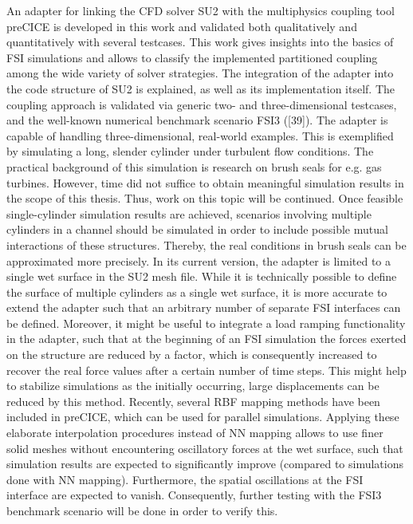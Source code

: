 An adapter for linking the CFD solver SU2 with the multiphysics coupling tool preCICE is developed in
this work and validated both qualitatively and quantitatively with several testcases.
This work gives insights into the basics of FSI simulations and allows to classify the implemented partitioned
coupling among the wide variety of solver strategies. The integration of the adapter into the code
structure of SU2 is explained, as well as its implementation itself. The coupling approach is validated
via generic two- and three-dimensional testcases, and the well-known numerical benchmark scenario FSI3
([39]). The adapter is capable of handling three-dimensional, real-world examples. This is exemplified
by simulating a long, slender cylinder under turbulent flow conditions. The practical background of this
simulation is research on brush seals for e.g. gas turbines. However, time did not suffice to obtain meaningful
simulation results in the scope of this thesis. Thus, work on this topic will be continued. Once
feasible single-cylinder simulation results are achieved, scenarios involving multiple cylinders in a channel
should be simulated in order to include possible mutual interactions of these structures. Thereby, the
real conditions in brush seals can be approximated more precisely. In its current version, the adapter
is limited to a single wet surface in the SU2 mesh file. While it is technically possible to define the
surface of multiple cylinders as a single wet surface, it is more accurate to extend the adapter such that
an arbitrary number of separate FSI interfaces can be defined. Moreover, it might be useful to integrate
a load ramping functionality in the adapter, such that at the beginning of an FSI simulation the forces
exerted on the structure are reduced by a factor, which is consequently increased to recover the real
force values after a certain number of time steps. This might help to stabilize simulations as the initially
occurring, large displacements can be reduced by this method. Recently, several RBF mapping methods
have been included in preCICE, which can be used for parallel simulations. Applying these elaborate
interpolation procedures instead of NN mapping allows to use finer solid meshes without encountering
oscillatory forces at the wet surface, such that simulation results are expected to significantly improve
(compared to simulations done with NN mapping). Furthermore, the spatial oscillations at the FSI interface
are expected to vanish. Consequently, further testing with the FSI3 benchmark scenario will be
done in order to verify this.
